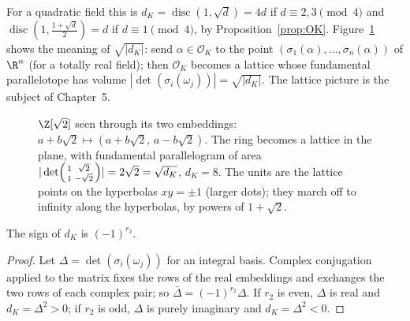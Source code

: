 For a quadratic field this is $d_K=\operatorname{disc}(1,\sqrt d)=4d$ if $d\equiv2,3\pmod4$ and
$\operatorname{disc}(1,\frac{1+\sqrt d}2)=d$ if $d\equiv1\pmod4$, by Proposition~\ref{prop:OK}. Figure~\ref{fig:mink}
shows the meaning of $\sqrt{|d_K|}$: send $\alpha\in\mathcal O_K$ to the point $(\sigma_1(\alpha),\dots,\sigma_n(\alpha))$
of $\R^n$ (for a totally real field); then $\mathcal O_K$ becomes a lattice whose fundamental parallelotope has volume
$|\det(\sigma_i(\omega_j))|=\sqrt{|d_K|}$. The lattice picture is the subject of Chapter~5.

\begin{figure}[ht]
\centering
{}
\caption{$\Z[\sqrt2]$ seen through its two embeddings: $a+b\sqrt2\mapsto(a+b\sqrt2,\,a-b\sqrt2)$. The ring becomes a
lattice in the plane, with fundamental parallelogram of area $|\det\begin{psmallmatrix}1&\sqrt2\\1&-\sqrt2\end{psmallmatrix}|=
2\sqrt2=\sqrt{d_K}$, $d_K=8$. The units are the lattice points on the hyperbolas $xy=\pm1$ (larger dots); they march
off to infinity along the hyperbolas, by powers of $1+\sqrt2$.}
\label{fig:mink}
\end{figure}

\begin{proposition}\label{prop:sign}
The sign of $d_K$ is $(-1)^{r_2}$.
\end{proposition}
\begin{proof}
Let $\Delta=\det(\sigma_i(\omega_j))$ for an integral basis. Complex conjugation applied to the matrix fixes the rows of
the real embeddings and exchanges the two rows of each complex pair; so $\bar\Delta=(-1)^{r_2}\Delta$. If $r_2$ is even,
$\Delta$ is real and $d_K=\Delta^2>0$; if $r_2$ is odd, $\Delta$ is purely imaginary and $d_K=\Delta^2<0$.
\end{proof}


